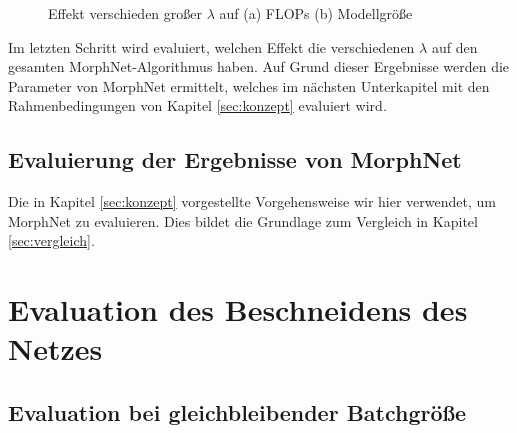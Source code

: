 \begin{figure}
     \centering
     \hfill
     \caption{Effekt verschieden großer $\lambda$ auf  (a) FLOPs (b) Modellgröße }
     \label{abb:morph2}
\end{figure}
Im letzten Schritt wird evaluiert, welchen Effekt die verschiedenen $\lambda$ auf den gesamten MorphNet-Algorithmus haben. Auf Grund dieser Ergebnisse werden die Parameter von MorphNet ermittelt, welches im nächsten Unterkapitel mit den Rahmenbedingungen von Kapitel \ref{sec:konzept} evaluiert wird.



\section{Evaluierung der Ergebnisse von MorphNet}

Die in Kapitel \ref{sec:konzept}  vorgestellte Vorgehensweise wir hier verwendet, um MorphNet zu evaluieren. Dies bildet die Grundlage zum Vergleich in Kapitel \ref{sec:vergleich}.











\chapter{Evaluation des Beschneidens des Netzes}\label{sec:ptexperimente}
\section{Evaluation bei gleichbleibender Batchgröße}

